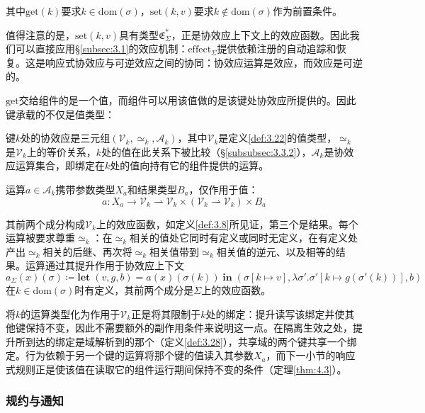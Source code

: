 其中$\mathrm{get}(k)$要求$k \in \mathrm{dom}(\sigma)$，$\mathrm{set}(k, v)$要求$k \notin \mathrm{dom}(\sigma)$作为前置条件。

值得注意的是，$\mathrm{set}(k, v)$具有类型$\mathfrak{E}^*_\Sigma$，正是协效应上下文上的效应函数。因此我们可以直接应用\S\ref{subsec:3.1}的效应机制：$\mathrm{effect}_\Sigma$提供依赖注册的自动追踪和恢复。这是响应式协效应与可逆效应之间的协同：协效应运算是效应，而效应是可逆的。

$\mathrm{get}$交给组件的是一个值，而组件可以用该值做的是该键处协效应所提供的。因此键承载的不仅是值类型：

\begin{definition}\label{def:3.24}
键$k$处的协效应是三元组$(\mathcal{V}_k, \simeq_k, \mathcal{A}_k)$，其中$\mathcal{V}_k$是定义\ref{def:3.22}的值类型，$\simeq_k$是$\mathcal{V}_k$上的等价关系，$k$处的值在此关系下被比较（\S\ref{subsubsec:3.3.2}），$\mathcal{A}_k$是协效应运算集合，即绑定在$k$处的值向持有它的组件提供的运算。
\end{definition}

运算$a \in \mathcal{A}_k$携带参数类型$X_a$和结果类型$B_a$，仅作用于值：
\begin{equation}\label{eq:3.22}
a: X_a \to \mathcal{V}_k \rightharpoonup \mathcal{V}_k \times (\mathcal{V}_k \rightharpoonup \mathcal{V}_k) \times B_a
\end{equation}

其前两个成分构成$\mathcal{V}_k$上的效应函数，如定义\ref{def:3.8}所见证，第三个是结果。每个运算被要求尊重$\simeq_k$：在$\simeq_k$相关的值处它同时有定义或同时无定义，在有定义处产出$\simeq_k$相关的后继、再次将$\simeq_k$相关值带到$\simeq_k$相关值的逆元、以及相等的结果。运算通过其提升作用于协效应上下文
\begin{equation}\label{eq:3.23}
a_\Sigma(x)(\sigma) \coloneqq \mathbf{let}\;(v, g, b) = a(x)(\sigma(k))\;\mathbf{in}\;(\sigma[k \mapsto v], \lambda\sigma'.\sigma'[k \mapsto g(\sigma'(k))], b)
\end{equation}
在$k \in \mathrm{dom}(\sigma)$时有定义，其前两个成分是$\Sigma$上的效应函数。

将$k$的运算类型化为作用于$\mathcal{V}_k$正是将其限制于$k$处的绑定：提升读写该绑定并使其他键保持不变，因此不需要额外的副作用条件来说明这一点。在隔离生效之处，提升所到达的绑定是域解析到的那个（定义\ref{def:3.28}），共享域的两个键共享一个绑定。行为依赖于另一个键的运算将那个键的值读入其参数$X_a$，而下一小节的响应式规则正是使该值在读取它的组件运行期间保持不变的条件（定理\ref{thm:4.3}）。

\subsubsection{规约与通知}\label{subsubsec:3.2.2}


